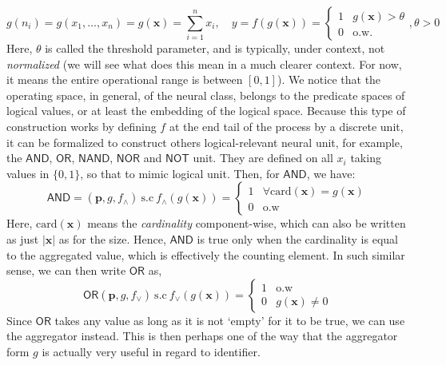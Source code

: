 \begin{equation*}
    g(n_i) = g(x_1,\dots,x_n) = g(\mathbf{x}) = \sum_{i=1}^{n} x_{i}, \quad y= f(g(\mathbf{x})) = \begin{cases}
        1 & g(\mathbf{x}) > \theta \\
        0 & \text{o.w.}
    \end{cases}, \theta > 0
\end{equation*}
Here, $\theta$ is called the threshold parameter, and is typically, under context, not \textit{normalized} (we will see what does this mean in a much clearer context. For now, it means the entire operational range is between $[0,1]$). We notice that the operating space, in general, of the neural class, belongs to the predicate spaces of logical values, or at least the embedding of the logical space. Because this type of construction works by defining $f$ at the end tail of the process by a discrete unit, it can be formalized to construct others logical-relevant neural unit, for example, the $\mathsf{AND}$, $\mathsf{OR}$, $\mathsf{NAND}$, $\mathsf{NOR}$ and $\mathsf{NOT}$ unit. They are defined on all $x_{i}$ taking values in $\{0,1\}$, so that to mimic logical unit. Then, for $\mathsf{AND}$, we have: 
\begin{equation}
    \mathsf{AND} = (\mathbf{p},g,f_{\land}) \: \text{s.c} \: f_{\land}(g(\mathbf{x})) =\begin{cases}
        1 & \forall \mathrm{card}(\mathbf{x}) = g(\mathbf{x})\\
        0 & \text{o.w}
    \end{cases}
\end{equation}
Here, $\mathrm{card}(\mathbf{x})$ means the \textit{cardinality} component-wise, which can also be written as just $\lvert\mathbf{x}\rvert$ as for the size. Hence, $\mathsf{AND}$ is true only when the cardinality is equal to the aggregated value, which is effectively the counting element. In such similar sense, we can then write $\mathsf{OR}$ as,
\begin{equation}
    \mathsf{OR}(\mathbf{p},g,f_{\lor})\: \text{s.c}\: f_{\lor}(g(\mathbf{x})) = \begin{cases}
        1 & \text{o.w}\\
        0 & g(\mathbf{x}) \neq 0
    \end{cases}
\end{equation}
Since $\mathsf{OR}$ takes any value as long as it is not `empty' for it to be true, we can use the aggregator instead. This is then perhaps one of the way that the aggregator form $g$ is actually very useful in regard to identifier. 
